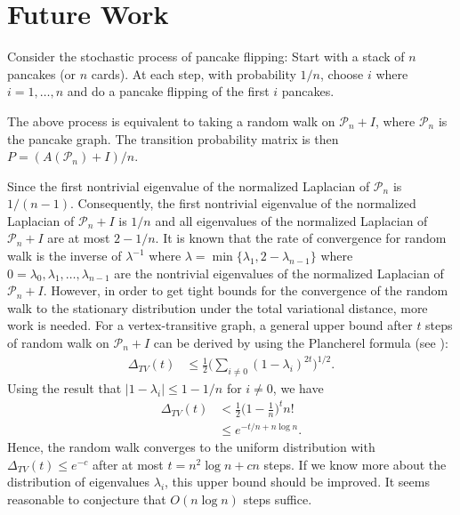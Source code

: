 
\section{Future Work}
Consider the stochastic process of pancake flipping:  Start with a stack of $n$ pancakes (or $n$ cards). At each
step, with probability $1/n$,  choose $i$ where $i=1, \ldots, n$ and  do a pancake flipping of the first $i$ pancakes. 

The above process is equivalent to taking a random walk on 
$\mathcal{P}_n + I$, where $\mathcal{P}_n$ is the pancake graph. The transition probability 
matrix is then $P=(A(\mathcal{P}_n)+I)/n$.

Since the first nontrivial eigenvalue of the normalized Laplacian of $\mathcal{P}_n$ is $1/(n-1)$. Consequently,
the first nontrivial eigenvalue of
the normalized Laplacian of $\mathcal{P}_n + I$ is $1/n$ and all eigenvalues of the normalized Laplacian
of $\mathcal{P}_n + I$ are at most $2-1/n$. It is known that the rate of convergence for random walk is the inverse of  $\lambda^{-1}$ where $\lambda= \min \{\lambda_1, 2-\lambda_{n-1}\}$ where $0=\lambda_0,
\lambda_1, \ldots, \lambda_{n-1}$ are the nontrivial eigenvalues of the normalized Laplacian of $\mathcal{P}_n + I$. However, in order to get tight bounds for the convergence of the random walk to the stationary distribution under the  total variational distance, more work is needed. For a vertex-transitive graph, a general upper bound after $t$ steps of random walk on 
$\mathcal{P}_n + I$ can be derived by using the Plancherel formula (see \cite{Chung1997}):
\begin{align*}
\Delta_{TV}(t) &\leq \frac 1 2 \Big( \sum_{i \not = 0} (1-\lambda_i)^{2t}\Big)^{1/2}.
\end{align*}
Using the result that $|1-\lambda_i| \leq 1-1/n$ for $i \not = 0$, we have
\begin{align*}
\Delta_{TV}(t) &< \frac 1 2 \Big(1-\frac 1 n\Big)^t n!\\
&\leq e^{-t/n+n \log n}.
\end{align*}
Hence, the random walk converges to the uniform distribution with $\Delta_{TV}(t) \leq e^{-c}$ after at most $t=n^2 \log n + c n$ steps.
If we know more about the distribution of eigenvalues $\lambda_i$, this upper bound should be improved.
It seems reasonable to conjecture that $O(n \log n)$ steps suffice.


